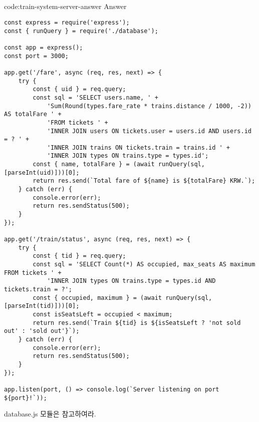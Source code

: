 \subsection*{}

\begin{codeenv}{code:train-system-server-answer}{ Answer}\begin{verbatim}
const express = require('express');
const { runQuery } = require('./database');

const app = express();
const port = 3000;

app.get('/fare', async (req, res, next) => {
    try {
        const { uid } = req.query;
        const sql = 'SELECT users.name, ' +
            'Sum(Round(types.fare_rate * trains.distance / 1000, -2)) AS totalFare ' +
            'FROM tickets ' +
            'INNER JOIN users ON tickets.user = users.id AND users.id = ? ' +
            'INNER JOIN trains ON tickets.train = trains.id ' +
            'INNER JOIN types ON trains.type = types.id';
        const { name, totalFare } = (await runQuery(sql, [parseInt(uid)]))[0];
        return res.send(`Total fare of ${name} is ${totalFare} KRW.`);
    } catch (err) {
        console.error(err);
        return res.sendStatus(500);
    }
});

app.get('/train/status', async (req, res, next) => {
    try {
        const { tid } = req.query;
        const sql = 'SELECT Count(*) AS occupied, max_seats AS maximum FROM tickets ' +
            'INNER JOIN types ON trains.type = types.id AND tickets.train = ?';
        const { occupied, maximum } = (await runQuery(sql, [parseInt(tid)]))[0];
        const isSeatsLeft = occupied < maximum;
        return res.send(`Train ${tid} is ${isSeatsLeft ? 'not sold out' : 'sold out'}`);
    } catch (err) {
        console.error(err);
        return res.sendStatus(500);
    }
});

app.listen(port, () => console.log(`Server listening on port ${port}!`));
\end{verbatim}
\end{codeenv}

database.js 모듈은 \과 \를 참고하여라.
